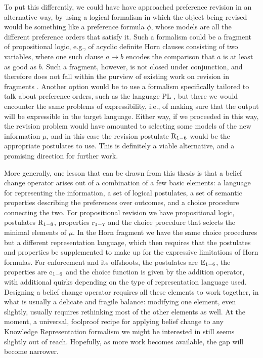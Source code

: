To put this differently, we could have have approached preference revision 
in an alternative way, by using a logical formalism
in which the object being revised would be something like 
a preference formula $\phi$, 
whose models are all the 
different preference orders that satisfy it. 
Such a formalism could be a fragment of propositional logic, e.g., of acyclic definite Horn clauses 
consisting of two variables, where one such clause $a\rightarrow b$ encodes the comparison 
that $a$ is at least as good as $b$. Such a fragment, however, is not closed 
under conjunction, and therefore does not fall within the purview of 
existing work on revision in fragments \cite{DelgrandePW18}.
Another option would be to use a formalism specifically tailored to 
talk about preference orders, such as the language $\mathrm{PL}$ \cite{BienvenuLW10},
but there we would encounter the same problems of expressibility, 
i.e., of making sure that the output will be expressible in the target language. 
Either way, if we proceeded in this way, the revision problem would 
have amounted to selecting some models of the new information $\mu$,
and in this case the revision postulate 
$\mathrm{R}_{1-6}$ would be the appropriate postulates to use. 
This is definitely a viable alternative, and a promising direction for further work.

More generally, one lesson that can be drawn from this thesis is that a belief change 
operator arises out of a combination of a few basic elements: 
a language for representing the information,
a set of logical postulates,
a set of semantic properties describing the preferences over outcomes, 
and a choice procedure connecting the two.
For propositional revision we have propositional logic, 
postulates $\mathrm{R}_{1-8}$, properties $\mathrm{r}_{1-7}$ and the choice procedure 
that selects the minimal elements of $\mu$.
In the Horn fragment we have the same choice procedures
but a different representation language,
which then requires that the postulates and properties be supplemented to make up 
for the expressive limitations of Horn formulas.
For enforcement and its offshoots, the postulates are $\mathrm{E}_{1-6}$, the properties are $\mathrm{e}_{1-6}$
and the choice function is given by the addition operator, with additional quirks depending on the 
type of representation language used.
Designing a belief change operator requires all these elements to work together, 
in what is usually a delicate and fragile balance: modifying one element, even slightly, usually requires 
rethinking most of the other elements as well. At the moment, a universal, foolproof recipe 
for applying belief change to any Knowledge Representation formalism we might be interested in
still seems slightly out of reach. Hopefully, as more work becomes available, the gap will become narrower.





